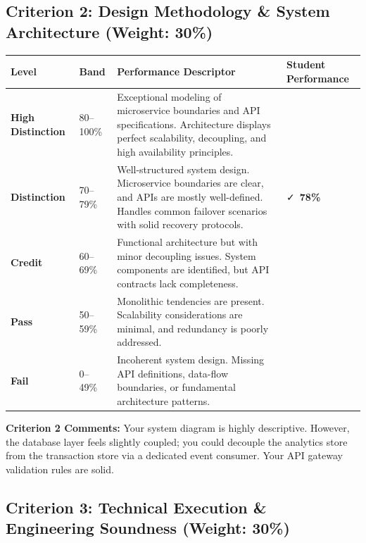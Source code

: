 \vspace{2.2em}

\subsection*{Criterion 2: Design Methodology \& System Architecture (Weight: 30\%)}

\noindent
\begin{tabularx}{\textwidth}{@{} >{\bfseries}l p{1.8cm} X >{\centering\arraybackslash}p{1.6cm} @{}}
\toprule
Level & Band & Performance Descriptor & Student Performance \\
\midrule
High Distinction & 80--100\% & Exceptional modeling of microservice boundaries and API specifications. Architecture displays perfect scalability, decoupling, and high availability principles. & \\
\midrule
Distinction & 70--79\% & Well-structured system design. Microservice boundaries are clear, and APIs are mostly well-defined. Handles common failover scenarios with solid recovery protocols. & \cellcolor{success!10}\faCheck\ \textbf{78\%} \\
\midrule
Credit & 60--69\% & Functional architecture but with minor decoupling issues. System components are identified, but API contracts lack completeness. & \\
\midrule
Pass & 50--59\% & Monolithic tendencies are present. Scalability considerations are minimal, and redundancy is poorly addressed. & \\
\midrule
Fail & 0--49\% & Incoherent system design. Missing API definitions, data-flow boundaries, or fundamental architecture patterns. & \\
\bottomrule
\end{tabularx}

\vspace{0.8em}
\begin{tcolorbox}[colback=lightbg, colframe=bordercolor, arc=2pt, left=8pt, right=8pt, top=6pt, bottom=6pt]
\small \textbf{Criterion 2 Comments:} Your system diagram is highly descriptive. However, the database layer feels slightly coupled; you could decouple the analytics store from the transaction store via a dedicated event consumer. Your API gateway validation rules are solid.
\end{tcolorbox}

\newpage

\subsection*{Criterion 3: Technical Execution \& Engineering Soundness (Weight: 30\%)}

